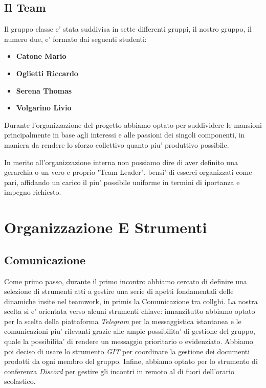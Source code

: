 \documentclass{report}
\begin{document}
		\section{Il Team}
			Il gruppo classe e' stata suddivisa in sette differenti gruppi, il nostro gruppo, il numero due, e' formato dai 
			seguenti studenti:
			\begin{itemize}
				\item \textbf{Catone Mario}
				\item \textbf{Oglietti Riccardo}
				\item \textbf{Serena Thomas}
				\item \textbf{Volgarino Livio}
			\end{itemize}
			Durante l'organizzazione del progetto abbiamo optato per suddividere le mansioni principalmente in base agli
			interessi e alle passioni dei singoli componenti, in maniera da rendere lo sforzo collettivo quanto piu'
			produttivo possibile. 

			In merito all'organizzazione interna non possiamo dire di aver definito una gerarchia o un vero e proprio 
			"Team Leader", bensi' di esserci organizzati come pari, affidando un carico il piu' possibile uniforme in 
			termini di iportanza e impegno richiesto.

	\chapter{Organizzazione E Strumenti}        
		\section{Comunicazione}
			Come primo passo, durante il primo incontro abbiamo cercato di definire una selezione di strumenti atti a 
			gestire una serie di apetti fondamentali delle dinamiche insite nel teamwork, in primis la Comunicazione
			tra collghi.
			La nostra scelta si e' orientata verso alcuni strumenti chiave: innanzitutto abbiamo optato per la scelta
			della piattaforma \emph{Telegram} per la messaggistica istantanea e le comunicazioni piu' rilevanti grazie
			alle ampie possibilita' di gestione del gruppo, quale la possibilita' di rendere un messaggio prioritario o
			evidenziato. Abbiamo poi deciso di usare lo strumento \emph{GIT} per coordinare la gestione dei documenti
			prodotti da ogni membro del gruppo. Infine, abbiamo optato per lo strumento di conferenza \emph{Discord} per
			gestire gli incontri in remoto al di fuori dell'orario scolastico.
\end{document}
